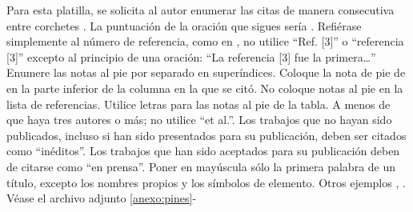 Para esta platilla, se solicita al autor enumerar las citas de manera consecutiva entre corchetes \cite{YLi2013}. 
La puntuación de la oración que sigues sería \cite{Mesaelides2011}. 
Refiérase simplemente al número de referencia, como en \cite{Morales2012}, no utilice “Ref. [3]” o “referencia [3]” excepto al principio de una oración: “La referencia [3] fue la primera…”
Enumere las notas al pie por separado en superíndices. Coloque la nota de pie de en la parte inferior de la columna en la que se citó. No coloque notas al pie en la lista de referencias. Utilice letras para las notas al pie de la tabla.
A menos de que haya tres autores o más; no utilice “et al.”. Los trabajos que no hayan sido publicados, incluso si han sido presentados para su publicación, deben ser citados como “inéditos”. Los trabajos que han sido aceptados para su publicación deben de citarse como “en prensa”. Poner en mayúscula sólo la primera palabra de un título, excepto los nombres propios y los símbolos de elemento. 
Otros ejemplos \cite{LAAngeles2021}, \cite{LAAngelesConni}. 
Véase el archivo adjunto \ref{anexo:pines}-





% 
% 
\appendix
% 
% 
